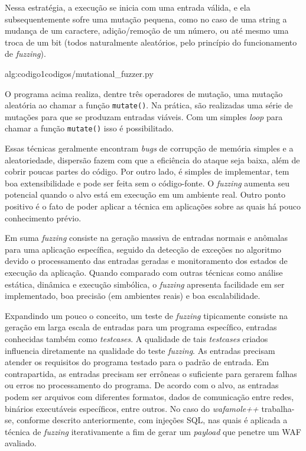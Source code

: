 Nessa estratégia, a execução se inicia com uma entrada válida, e ela subsequentemente sofre uma mutação pequena, como no caso de uma string a mudança de um caractere, adição/remoção de um número, ou até mesmo uma troca de um bit (todos naturalmente aleatórios, pelo princípio do funcionamento de \textit{fuzzing}).

 {alg:codigo1}{codigos/mutational_fuzzer.py}

\bigskip
O programa acima realiza, dentre três operadores de mutação, uma mutação aleatória ao chamar a função \verb+mutate()+. Na prática, são realizadas uma série de mutações para que se produzam entradas viáveis. Com um simples \textit{loop} para chamar a função \verb+mutate()+ isso é possibilitado.

Essas técnicas geralmente encontram \textit{bugs} de corrupção de memória simples e a aleatoriedade, dispersão fazem com que a eficiência do ataque seja baixa, além de cobrir poucas partes do código. Por outro lado, é simples de implementar, tem boa extensibilidade e pode ser feita sem o código-fonte. O \textit{fuzzing} aumenta seu potencial quando o alvo está em execução em um ambiente real. Outro ponto positivo é o fato de poder aplicar a técnica em aplicações sobre as quais há pouco conhecimento prévio.

Em suma \textit{fuzzing} consiste na geração massiva de entradas normais e anômalas para uma aplicação específica, seguido da detecção de exceções no algoritmo devido o processamento das entradas geradas e monitoramento dos estados de execução da aplicação. Quando comparado com outras técnicas como análise estática, dinâmica e execução simbólica, o \textit{fuzzing} apresenta facilidade em ser implementado, boa precisão (em ambientes reais) e boa escalabilidade.

Expandindo um pouco o conceito, um teste de \textit{fuzzing} tipicamente consiste na geração em larga escala de entradas para um programa específico, entradas conhecidas também como \textit{testcases}. A qualidade de tais \textit{testcases} criados influencia diretamente na qualidade do teste \textit{fuzzing}. As entradas precisam atender os requisitos do programa testado para o padrão de entrada. Em contrapartida, as entradas precisam ser errôneas o suficiente para gerarem falhas ou erros no processamento do programa. De acordo com o alvo, as entradas podem ser arquivos com diferentes formatos, dados de comunicação entre redes, binários executáveis específicos, entre outros. No caso do \textit{wafamole++} trabalha-se, conforme descrito anteriormente, com injeções SQL, nas quais é aplicada a técnica de \textit{fuzzing} iterativamente a fim de gerar um \textit{payload} que penetre um WAF avaliado.

